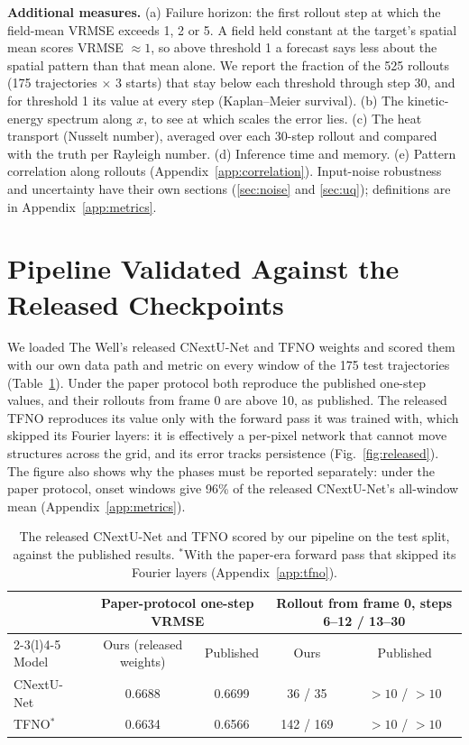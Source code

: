 \documentclass[11pt]{article}
\begin{document}
\textbf{Additional measures.} (a) Failure horizon: the first rollout step at which the field-mean VRMSE exceeds 1, 2
or 5. A field held constant at the target's spatial mean scores VRMSE $\approx 1$, so above threshold 1 a forecast
says less about the spatial pattern than that mean alone. We report the fraction of the 525 rollouts (175
trajectories $\times$ 3 starts) that stay below each threshold through step 30, and for threshold 1 its value at every
step (Kaplan--Meier survival). (b) The kinetic-energy spectrum along $x$, to see at which scales the error lies.
(c) The heat transport (Nusselt number), averaged over each 30-step rollout and compared with the truth per Rayleigh
number. (d) Inference time and memory. (e) Pattern correlation along rollouts
(Appendix~\ref{app:correlation}). Input-noise robustness and uncertainty have their own sections
(\ref{sec:noise} and \ref{sec:uq}); definitions are in Appendix~\ref{app:metrics}.

\section{Pipeline Validated Against the Released Checkpoints}
\label{sec:m1}

We loaded The Well's released CNextU-Net and TFNO weights and scored them with our own data path and metric on
every window of the 175 test trajectories (Table~\ref{tab:released}). Under the paper protocol both reproduce the
published one-step values, and their rollouts from frame 0 are above 10, as published. The released TFNO reproduces
its value only with the forward pass it was trained with, which skipped its Fourier layers: it is effectively a
per-pixel network that cannot move structures across the grid, and its error tracks persistence
(Fig.~\ref{fig:released}). The figure also shows why the phases must be reported separately: under the paper
protocol, onset windows give 96\% of the released CNextU-Net's all-window mean (Appendix~\ref{app:metrics}).

\begin{table}[!htbp]
\centering\small
\begin{tabular}{@{}lcccc@{}}
\toprule
& \multicolumn{2}{c}{Paper-protocol one-step VRMSE} & \multicolumn{2}{c}{Rollout from frame 0, steps 6--12 / 13--30} \\
\cmidrule(lr){2-3}\cmidrule(l){4-5}
Model & Ours (released weights) & Published & Ours & Published \\
\midrule
CNextU-Net & 0.6688 & 0.6699 & 36 / 35 & $>10$ / $>10$ \\
TFNO$^{*}$ & 0.6634 & 0.6566 & 142 / 169 & $>10$ / $>10$ \\
\bottomrule
\end{tabular}
\caption{The released CNextU-Net and TFNO scored by our pipeline on the test split, against the published results.
$^{*}$With the paper-era forward pass that skipped its Fourier layers (Appendix~\ref{app:tfno}).}
\label{tab:released}
\end{table}
\end{document}
